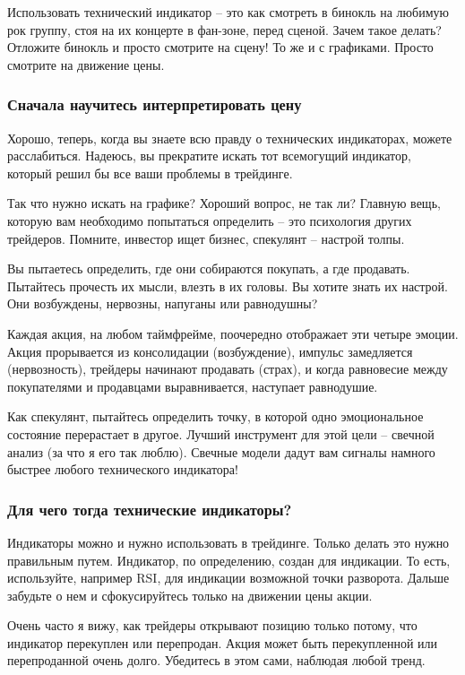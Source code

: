 \documentclass{book}
\begin{document}
Использовать технический индикатор – это как смотреть в бинокль на
любимую рок группу, стоя на их концерте в фан-зоне, перед
сценой. Зачем такое делать? Отложите бинокль и просто смотрите на
сцену! То же и с графиками. Просто смотрите на движение цены.

\subsubsection{Сначала научитесь интерпретировать цену}

Хорошо, теперь, когда вы знаете всю правду о технических индикаторах, можете расслабиться. Надеюсь, вы прекратите искать тот всемогущий индикатор, который решил бы все ваши проблемы в трейдинге.

Так что нужно искать на графике? Хороший вопрос, не так ли? Главную вещь, которую вам необходимо попытаться определить – это психология других трейдеров. Помните, инвестор ищет бизнес, спекулянт – настрой толпы.

Вы пытаетесь определить, где они собираются покупать, а где продавать. Пытайтесь прочесть их мысли, влезть в их головы. Вы хотите знать их настрой. Они возбуждены, нервозны, напуганы или равнодушны?

Каждая акция, на любом таймфрейме, поочередно отображает эти четыре эмоции. Акция прорывается из консолидации (возбуждение), импульс замедляется (нервозность), трейдеры начинают продавать (страх), и когда равновесие между покупателями и продавцами выравнивается, наступает равнодушие.

Как спекулянт, пытайтесь определить точку, в которой одно
эмоциональное состояние перерастает в другое. Лучший инструмент для
этой цели – свечной анализ (за что я его так люблю). Свечные модели
дадут вам сигналы намного быстрее любого технического индикатора!

\subsubsection{Для чего тогда технические индикаторы?}

Индикаторы можно и нужно использовать в трейдинге. Только делать это нужно правильным путем. Индикатор, по определению, создан для индикации. То есть, используйте, например RSI, для индикации возможной точки разворота. Дальше забудьте о нем и сфокусируйтесь только на движении цены акции.

Очень часто я вижу, как трейдеры открывают позицию только потому, что индикатор перекуплен или перепродан. Акция может быть перекупленной или перепроданной очень долго. Убедитесь в этом сами, наблюдая любой тренд.
\end{document}

